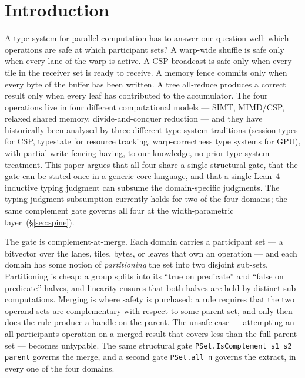 \documentclass[acmsmall,screen,review,anonymous,nonacm]{acmart}
\begin{document}

\maketitle


\section{Introduction}\label{sec:introduction}

A type system for parallel computation has to answer one question well: which operations are safe at which participant sets? A warp-wide shuffle is safe only when every lane of the warp is active. A CSP broadcast is safe only when every tile in the receiver set is ready to receive. A memory fence commits only when every byte of the buffer has been written. A tree all-reduce produces a correct result only when every leaf has contributed to the accumulator. The four operations live in four different computational models --- SIMT, MIMD/CSP, relaxed shared memory, divide-and-conquer reduction --- and they have historically been analysed by three different type-system traditions (session types for CSP, typestate for resource tracking, warp-correctness type systems for GPU), with partial-write fencing having, to our knowledge, no prior type-system treatment. This paper argues that all four share a single structural gate, that the gate can be stated once in a generic core language, and that a single Lean~4 inductive typing judgment can subsume the domain-specific judgments. The typing-judgment subsumption currently holds for two of the four domains; the same complement gate governs all four at the width-parametric layer~(\S\ref{sec:spine}).

The gate is complement-at-merge. Each domain carries a participant set --- a bitvector over the lanes, tiles, bytes, or leaves that own an operation --- and each domain has some notion of \emph{partitioning} the set into two disjoint sub-sets. Partitioning is cheap: a group splits into its ``true on predicate'' and ``false on predicate'' halves, and linearity ensures that both halves are held by distinct sub-computations. Merging is where safety is purchased: a rule requires that the two operand sets are complementary with respect to some parent set, and only then does the rule produce a handle on the parent. The unsafe case --- attempting an all-participants operation on a merged result that covers less than the full parent set --- becomes untypable. The same structural gate \texttt{PSet.IsComplement s1 s2 parent} governs the merge, and a second gate \texttt{PSet.all n} governs the extract, in every one of the four domains.
\end{document}
